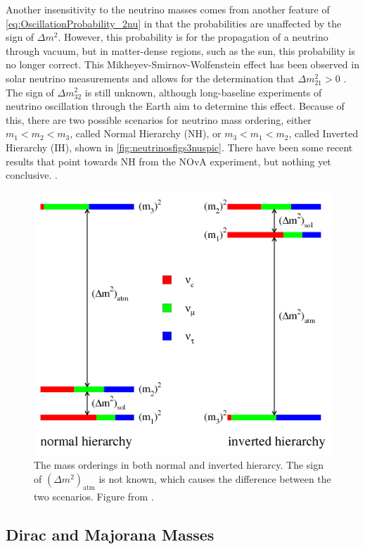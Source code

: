 Another insensitivity to the neutrino masses comes from another feature of \autoref{eq:OscillationProbability_2nu} in that the probabilities are unaffected by the sign of $\Delta m^2$. However, this probability is for the propagation of a neutrino through vacuum, but in matter-dense regions, such as the sun, this probability is no longer correct. This Mikheyev-Smirnov-Wolfenstein effect has been observed in solar neutrino measurements and allows for the determination that $\Delta m_{21}^2>0$ \cite{1367-2630-6-1-139}. The sign of $\Delta m_{32}^2$ is still unknown, although long-baseline experiments of neutrino oscillation through the Earth aim to determine this effect. Because of this, there are two possible scenarios for neutrino mass ordering, either $m_1 < m_2 < m_3$, called Normal Hierarchy (NH), or $m_3 < m_1 < m_2$, called Inverted Hierarchy (IH), shown in \autoref{fig:neutrinosfigs3nuspic}. There have been some recent results that point towards NH from the NOvA experiment, but nothing yet conclusive. \cite{Adamson:2017gxd}.

\begin{figure}[tbph]
\centering
\includegraphics[width=0.7\linewidth]{Figures/Neutrinos_figs_3nuspic.png}
\caption[The mass orderings in both normal and inverted hierarchy. The sign of $(\Delta m^2)_{\textrm{atm}}$ is not known, which causes the difference between the two scenarios.]{The mass orderings in both normal and inverted hierarcy. The sign of $(\Delta m^2)_{\textrm{atm}}$ is not known, which causes the difference between the two scenarios. Figure from \cite{Hewett:2012ns}.}
\label{fig:neutrinosfigs3nuspic}
\end{figure}

\subsection{Dirac and Majorana Masses}
\label{ssec:Dirac and Majorana Masses}


